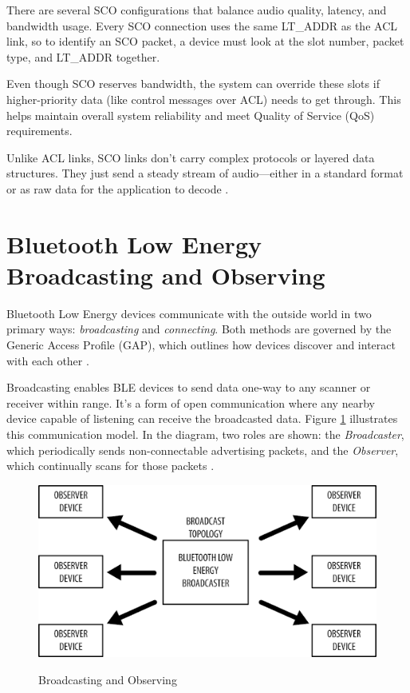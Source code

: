 There are several SCO configurations that balance audio quality, latency, and bandwidth usage. Every SCO connection uses the same LT\_ADDR as the ACL link, so to identify an SCO packet, a device must look at the slot number, packet type, and LT\_ADDR together.

Even though SCO reserves bandwidth, the system can override these slots if higher-priority data (like control messages over ACL) needs to get through. This helps maintain overall system reliability and meet Quality of Service (QoS) requirements.

Unlike ACL links, SCO links don’t carry complex protocols or layered data structures. They just send a steady stream of audio—either in a standard format or as raw data for the application to decode \cite{bluetoothcorespec6}.

\section{Bluetooth Low Energy Broadcasting and Observing}

Bluetooth Low Energy devices communicate with the outside world in two primary ways: \textit{broadcasting} and \textit{connecting}. Both methods are governed by the Generic Access Profile (GAP), which outlines how devices discover and interact with each other \cite{gettingstartedwble}.

Broadcasting enables BLE devices to send data one-way to any scanner or receiver within range. It’s a form of open communication where any nearby device capable of listening can receive the broadcasted data. Figure \ref{fig:broadcastobserve} illustrates this communication model. In the diagram, two roles are shown: the \textit{Broadcaster}, which periodically sends non-connectable advertising packets, and the \textit{Observer}, which continually scans for those packets \cite{gettingstartedwble}.

\begin{figure}[h]
    \caption{Broadcasting and Observing}
    \includegraphics{broadcastobserve.png}
    \label{fig:broadcastobserve}
    \end{figure}

